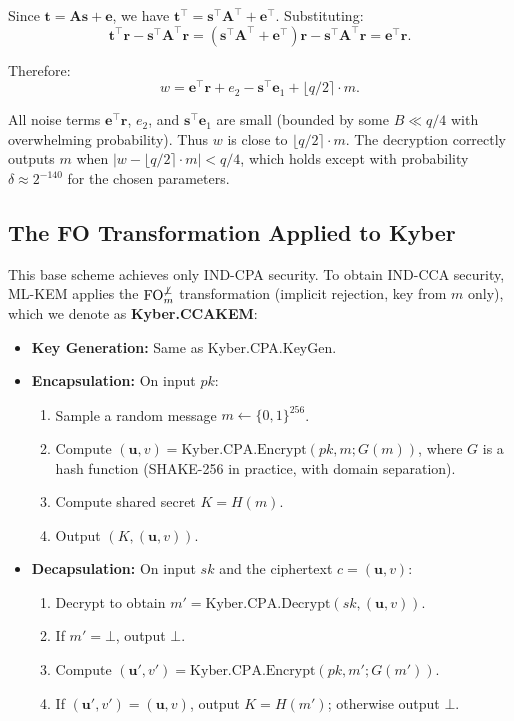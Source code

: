 Since $\boldsymbol{t} = \boldsymbol{A}\boldsymbol{s} + \boldsymbol{e}$, we have $\boldsymbol{t}^\top = \boldsymbol{s}^\top \boldsymbol{A}^\top + \boldsymbol{e}^\top$. Substituting:
$$
\boldsymbol{t}^\top \boldsymbol{r} - \boldsymbol{s}^\top \boldsymbol{A}^\top \boldsymbol{r} = (\boldsymbol{s}^\top \boldsymbol{A}^\top + \boldsymbol{e}^\top)\boldsymbol{r} - \boldsymbol{s}^\top \boldsymbol{A}^\top \boldsymbol{r} = \boldsymbol{e}^\top \boldsymbol{r}.
$$

Therefore:
$$
w = \boldsymbol{e}^\top \boldsymbol{r} + e_2 - \boldsymbol{s}^\top \boldsymbol{e}_1 + \lfloor q/2 \rceil \cdot m.
$$

All noise terms $\boldsymbol{e}^\top \boldsymbol{r}$, $e_2$, and $\boldsymbol{s}^\top \boldsymbol{e}_1$ are small (bounded by some $B \ll q/4$ with overwhelming probability). Thus $w$ is close to $\lfloor q/2 \rceil \cdot m$. The decryption correctly outputs $m$ when $|w - \lfloor q/2 \rceil \cdot m| < q/4$, which holds except with probability $\delta \approx 2^{-140}$ for the chosen parameters.

\subsection{The FO Transformation Applied to Kyber}

This base scheme achieves only IND-CPA security. To obtain IND-CCA security, ML-KEM applies the $\text{FO}_m^{\not\bot}$ transformation (implicit rejection, key from $m$ only), which we denote as \textbf{Kyber.CCAKEM}:

\begin{itemize}
    \item \textbf{Key Generation:} Same as Kyber.CPA.KeyGen.
    \item \textbf{Encapsulation:} On input $pk$:
    \begin{enumerate}
        \item Sample a random message $m \gets \{0,1\}^{256}$.
        \item Compute $(\boldsymbol{u}, v) = \text{Kyber.CPA.Encrypt}(pk, m; G(m))$, where $G$ is a hash function (SHAKE-256 in practice, with domain separation).
        \item Compute shared secret $K = H(m)$.
        \item Output $(K, (\boldsymbol{u}, v))$.
    \end{enumerate}
    \item \textbf{Decapsulation:} On input $sk$ and the ciphertext $c = (\boldsymbol{u}, v)$:
    \begin{enumerate}
        \item Decrypt to obtain $m' = \text{Kyber.CPA.Decrypt}(sk, (\boldsymbol{u}, v))$.
        \item If $m' = \bot$, output $\bot$.
        \item Compute $(\boldsymbol{u}', v') = \text{Kyber.CPA.Encrypt}(pk, m'; G(m'))$.
        \item If $(\boldsymbol{u}', v') = (\boldsymbol{u}, v)$, output $K = H(m')$; otherwise output $\bot$.
    \end{enumerate}
\end{itemize}

